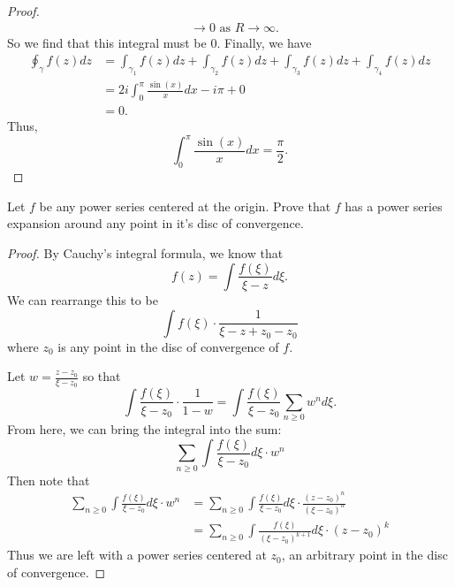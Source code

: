 \documentclass[12pt]{article}
\newenvironment{statement}[2][Statement]{\begin{trivlist}
\item[\hskip \labelsep {\bfseries #1}\hskip \labelsep {\bfseries #2.}]}{\end{trivlist}}
\begin{document}
\begin{proof}
\begin{align*}
                                                                        & \to 0 \text{ as } R \to \infty .
  \end{align*}
  So we find that this integral must be 0.
  Finally, we have 
  \begin{align*} 
    \oint_{\gamma} f(z)dz &= \int_{\gamma_1} f(z)dz + \int_{\gamma_2} f(z)dz + \int_{\gamma_3} f(z)dz +\int_{\gamma_4} f(z)dz \\
                          &= 2i \int^{\pi}_0 \frac{\sin(x)}{x} dx - i\pi + 0 \\
                          &= 0.
  \end{align*}
  Thus, 
  \begin{equation*}
    \int^{\pi}_0 \frac{\sin(x)}{x} dx = \frac{\pi}{2}.
  \end{equation*}
\end{proof}

\begin{statement}[Problem]{(Tie) 2}
  Let $f$ be any power series centered at the origin. Prove that $f$ has a power series expansion around any point in it's disc of convergence.
\end{statement}
\begin{proof}
  By Cauchy's integral formula, we know that 
  \begin{equation*}
    f(z) = \int \frac{f(\xi)}{\xi - z} d \xi.
  \end{equation*}
  We can rearrange this to be
  \begin{equation*}
    \int f(\xi) \cdot \frac{1}{\xi - z + z_0 -z_0}
  \end{equation*}
  where $z_0$ is any point in the disc of convergence of $f$. 
  \par Let $w = \frac{z-z_0}{\xi - z_0}$ so that 
  \begin{equation*}
    \int \frac{f(\xi)}{\xi - z_0} \cdot \frac{1}{1-w} = \int \frac{f(\xi)}{\xi - z_0} \sum_{n \geq  0} w^n d \xi.
  \end{equation*}
  From here, we can bring the integral into the sum:
  \begin{equation*}
    \sum_{n \geq 0} \int \frac{f(\xi)}{\xi - z_0} d \xi \cdot w^n
  \end{equation*}
  Then note that 
  \begin{align*} 
    \sum_{n \geq 0} \int \frac{f(\xi)}{\xi - z_0} d \xi \cdot w^n &= \sum_{n \geq 0} \int \frac{f(\xi)}{\xi - z_0} d \xi \cdot \frac{(z-z_0)^n}{(\xi - z_0)^n} \\
                                                                  &= \sum_{n \geq 0} \int \frac{f(\xi)}{(\xi - z_0)^{k+1}} d \xi \cdot (z-z_0)^k
  \end{align*}
  Thus we are left with a power series centered at $z_0$, an arbitrary point in the disc of convergence.
\end{proof}
\end{document}
